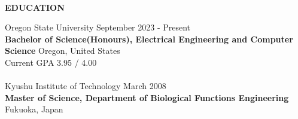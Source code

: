 \begin{flushleft}
	\hrulefill \\
	\begin{large}
		\textbf{EDUCATION}
	\end{large}
\end{flushleft}
Oregon State University \hfill September 2023 - Present\\
\textbf{Bachelor of Science(Honours), Electrical Engineering and Computer Science}  \hfill Oregon, United States\\
Current GPA 3.95 / 4.00\\
\\
Kyushu Institute of Technology \hfill March 2008\\
\textbf{Master of Science, Department of Biological Functions Engineering} \hfill Fukuoka, Japan\\
